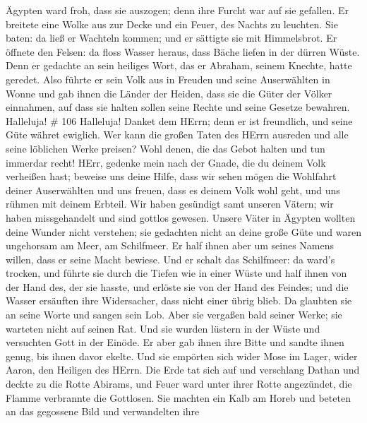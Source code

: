 Ägypten ward froh, dass sie auszogen; denn ihre Furcht war
auf sie gefallen.  Er breitete eine Wolke aus zur Decke und
ein Feuer, des Nachts zu leuchten.  Sie baten: da ließ er
Wachteln kommen; und er sättigte sie mit Himmelsbrot.  Er
öffnete den Felsen: da floss Wasser heraus, dass Bäche liefen in der
dürren Wüste.  Denn er gedachte an sein heiliges Wort, das
er Abraham, seinem Knechte, hatte geredet.  Also führte er
sein Volk aus in Freuden und seine Auserwählten in Wonne 
und gab ihnen die Länder der Heiden, dass sie die Güter der Völker
einnahmen,  auf dass sie halten sollen seine Rechte und
seine Gesetze bewahren. Halleluja! \# 106  Halleluja! Danket
dem HErrn; denn er ist freundlich, und seine Güte währet ewiglich.
 Wer kann die großen Taten des HErrn ausreden und alle seine
löblichen Werke preisen?  Wohl denen, die das Gebot halten
und tun immerdar recht!  HErr, gedenke mein nach der Gnade,
die du deinem Volk verheißen hast; beweise uns deine Hilfe, 
dass wir sehen mögen die Wohlfahrt deiner Auserwählten und uns freuen,
dass es deinem Volk wohl geht, und uns rühmen mit deinem Erbteil.
 Wir haben gesündigt samt unseren Vätern; wir haben
missgehandelt und sind gottlos gewesen.  Unsere Väter in
Ägypten wollten deine Wunder nicht verstehen; sie gedachten nicht an
deine große Güte und waren ungehorsam am Meer, am Schilfmeer.
 Er half ihnen aber um seines Namens willen, dass er seine
Macht bewiese.  Und er schalt das Schilfmeer: da ward's
trocken, und führte sie durch die Tiefen wie in einer Wüste
 und half ihnen von der Hand des, der sie hasste, und
erlöste sie von der Hand des Feindes;  und die Wasser
ersäuften ihre Widersacher, dass nicht einer übrig blieb. 
Da glaubten sie an seine Worte und sangen sein Lob.  Aber
sie vergaßen bald seiner Werke; sie warteten nicht auf seinen Rat.
 Und sie wurden lüstern in der Wüste und versuchten Gott in
der Einöde.  Er aber gab ihnen ihre Bitte und sandte ihnen
genug, bis ihnen davor ekelte.  Und sie empörten sich wider
Mose im Lager, wider Aaron, den Heiligen des HErrn.  Die
Erde tat sich auf und verschlang Dathan und deckte zu die Rotte Abirams,
 und Feuer ward unter ihrer Rotte angezündet, die Flamme
verbrannte die Gottlosen.  Sie machten ein Kalb am Horeb
und beteten an das gegossene Bild  und verwandelten ihre
